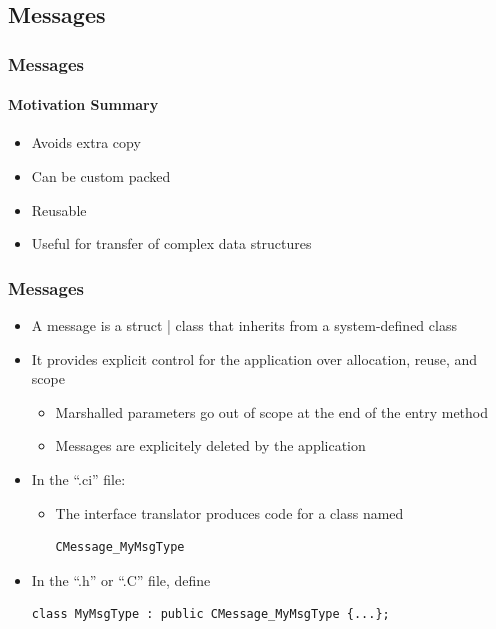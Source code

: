 \subsection[Messages]{Messages}

\begin{frame}[fragile]
  \frametitle{Messages}
  \framesubtitle{Motivation Summary}
  \begin{itemize}
    \item Avoids extra copy
    \item Can be custom packed
    \item Reusable
    \item Useful for transfer of complex data structures
  \end{itemize}
\end{frame}

\begin{frame}[fragile]
  \frametitle{Messages}
  \begin{itemize}
    \item A message is a struct | class that inherits from a system-defined class
    \item It provides explicit control for the application over allocation, reuse, and scope
    \begin{itemize}
      \item Marshalled parameters go out of scope at the end of the entry method
      \item Messages are explicitely deleted by the application
    \end{itemize}
    \item In the ``.ci'' file:
      \begin{itemize}
         \begin{lstlisting}
message MyMsgType;
         \end{lstlisting}
         \item The interface translator produces code for a class named
         \begin{lstlisting}
CMessage_MyMsgType
         \end{lstlisting}
      \end{itemize} 
      \item In the ``.h'' or ``.C'' file, define
      \begin{lstlisting}
class MyMsgType : public CMessage_MyMsgType {...};
      \end{lstlisting}
  \end{itemize}
\end{frame}

